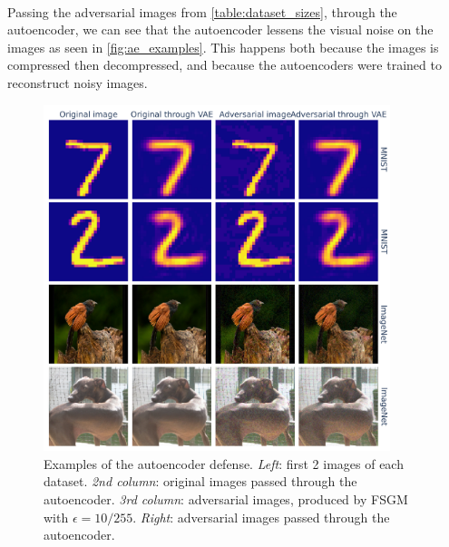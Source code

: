 \documentclass[]{scrarticle}
\renewcommand{\todo}[1]{}
\begin{document}
\todo{Maybe add a plot for distance between latent representations of clean vs adversarial}



\paragraph{}
Passing the adversarial images from \autoref{table:dataset_sizes},
through the autoencoder, we can see that the autoencoder
lessens the visual noise on the images as seen in \autoref{fig:ae_examples}.
This happens both because the images is compressed then decompressed,
and because the autoencoders were trained to reconstruct noisy images.

\begin{figure}[h]
  \centering
  \includegraphics[width=0.9\textwidth]{images/ae_examples.png}
  \caption{
    Examples of the autoencoder defense.
    \emph{Left}: first 2 images of each dataset.
    \emph{2nd column}: original images passed through the autoencoder.
    \emph{3rd column}: adversarial images, produced by FSGM with $\epsilon = 10/ 255$.
    \emph{Right}: adversarial images passed through the autoencoder.
  }
  \label{fig:ae_examples}
\end{figure}
\end{document}
